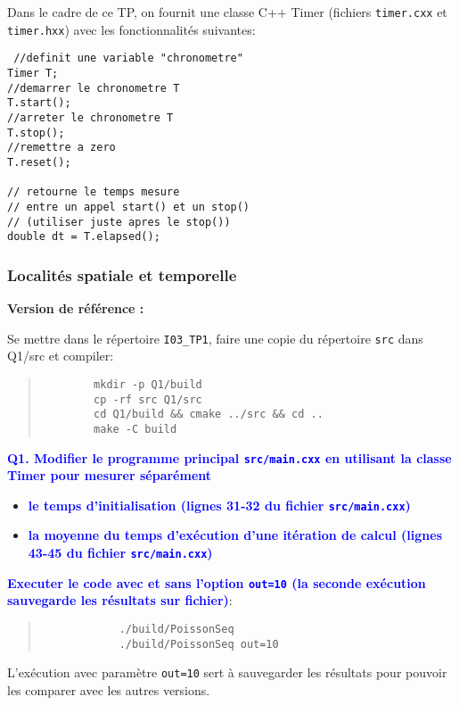 \documentclass{beamer}
\begin{document}
\begin{frame}[fragile]
Dans le cadre de ce TP, on fournit une classe C++ Timer (fichiers {\tt timer.cxx} et {\tt timer.hxx}) avec les fonctionnalités suivantes:

\begin{lstlisting}
 //definit une variable "chronometre"
Timer T; 
//demarrer le chronometre T
T.start();
//arreter le chronometre T
T.stop();
//remettre a zero
T.reset();

// retourne le temps mesure 
// entre un appel start() et un stop()
// (utiliser juste apres le stop())
double dt = T.elapsed(); 
\end{lstlisting}

\end{frame}

\begin{frame}[fragile]
\frametitle{Localit\'es spatiale et temporelle}
	\vfill
	
	{\bf Version de r\'ef\'erence :}
    \vfill

	Se mettre dans le r\'epertoire {\tt I03\_TP1}, faire une copie du r\'epertoire {\tt src} dans {Q1/src} et compiler:
	\begin{quote}
		\begin{verbatim}
		mkdir -p Q1/build
		cp -rf src Q1/src
		cd Q1/build && cmake ../src && cd ..
		make -C build
		\end{verbatim}
	\end{quote}

	\vfill

\end{frame}

\begin{frame}[fragile]
	\textcolor{blue}{\bf Q1. Modifier le programme principal {\tt src/main.cxx} en utilisant la classe Timer pour mesurer s\'epar\'ement}
	\begin{itemize}
	\item \textcolor{blue}{\bf le temps d'initialisation (lignes 31-32 du fichier {\tt src/main.cxx})}
	\item \textcolor{blue}{\bf la moyenne du temps d'ex\'ecution d'une it\'eration de calcul (lignes 43-45 du fichier {\tt src/main.cxx})}
	\end{itemize}

	\vfill
	\textcolor{blue}{\bf Executer le code avec et sans l'option {\tt out=10} (la seconde ex\'ecution sauvegarde les r\'esultats sur fichier)}:
	\begin{quote}
		\color{blue}
		\begin{verbatim}
			./build/PoissonSeq
			./build/PoissonSeq out=10
		\end{verbatim}
	\end{quote}

	L'ex\'ecution avec param\`etre {\tt out=10} sert \`a sauvegarder les r\'esultats pour pouvoir les comparer avec les autres versions.
	
\vfill
\end{frame}
\end{document}
